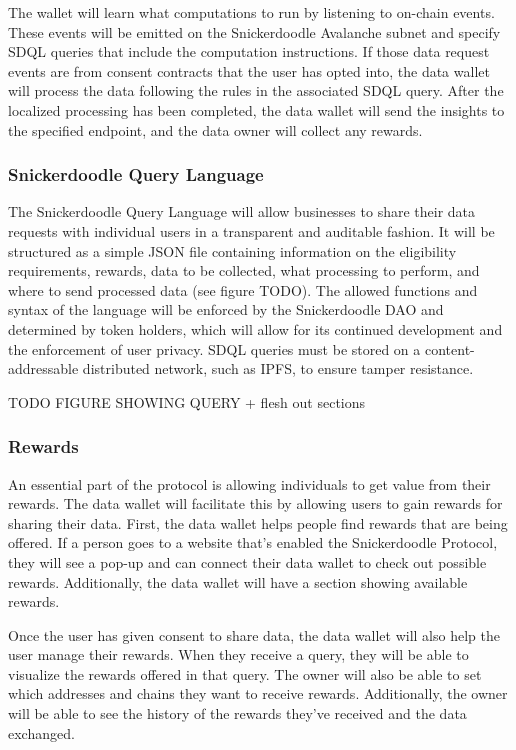 The wallet will learn what computations to run by listening to on-chain events. These events will be emitted on the Snickerdoodle Avalanche 
subnet and specify SDQL queries that include the computation instructions. If those data request events are from consent contracts that the 
user has opted into, the data wallet will process the data following the rules in the associated SDQL query. After the localized processing 
has been completed, the data wallet will send the insights to the specified endpoint, and the data owner will collect any rewards.


\subsubsection{Snickerdoodle Query Language} %
\label{section:SDQL}

The Snickerdoodle Query Language will allow businesses to share their data requests with individual users in a transparent and auditable fashion. 
It will be structured as a simple JSON file containing information on the eligibility requirements, rewards, data to be collected, what processing 
to perform, and where to send processed data (see figure TODO). The allowed functions and syntax of the language will be enforced by the 
Snickerdoodle DAO and determined by token holders, which will allow for its continued development and the enforcement of user privacy. SDQL 
queries must be stored on a content-addressable distributed network, such as IPFS, to ensure tamper resistance. 

TODO FIGURE SHOWING QUERY + flesh out sections


\subsubsection{Rewards}

An essential part of the protocol is allowing individuals to get value from their rewards. The data wallet will facilitate this by allowing users 
to gain rewards for sharing their data. First, the data wallet helps people find rewards that are being offered. If a person goes to a website 
that's enabled the Snickerdoodle Protocol, they will see a pop-up and can connect their data wallet to check out possible rewards. Additionally, 
the data wallet will have a section showing available rewards.


Once the user has given consent to share data, the data wallet will also help the user manage their rewards. When they receive a query, they will 
be able to visualize the rewards offered in that query. The owner will also be able to set which addresses and chains they want to receive rewards. 
Additionally, the owner will be able to see the history of the rewards they've received and the data exchanged. 

